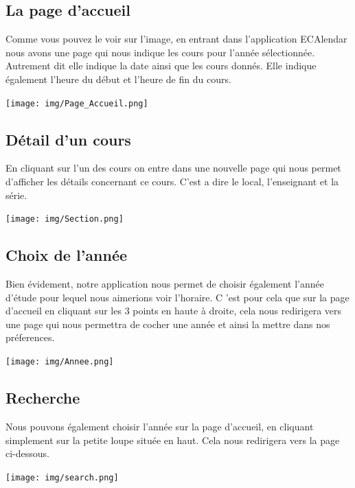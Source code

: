 \documentclass{article}
\begin{document}
	 \subsection{La page d'accueil}
	 Comme vous pouvez le voir sur l'image, en entrant dans l'application ECAlendar nous avons une page qui nous indique les cours pour l'ann\'ee s\'electionn\'ee. Autrement dit elle indique la date ainsi que les cours donn\'es. Elle indique \'egalement l'heure du début et l'heure de fin du cours.
	   \begin{center}
            \texttt{[image: img/Page\_Accueil.png]}
        \end{center}


	 \subsection{D\'etail d'un cours}
	 En cliquant sur l'un des cours on entre dans une nouvelle page qui nous permet d'afficher les d\'etails concernant ce cours. C'est a dire le local, l'enseignant et la s\'erie.
        \begin{center}
            \texttt{[image: img/Section.png]}
        \end{center}

            \subsection{Choix de l'ann\'ee}
	Bien évidement, notre application nous permet de choisir \'egalement l'ann\'ee d'\'etude pour lequel nous aimerions voir l'horaire. C 'est pour cela que sur la page d'accueil en  cliquant sur les 3 points  en haute \`a droite, cela nous redirigera vers une page qui nous permettra de cocher une ann\'ee et ainsi la mettre dans nos pr\'eferences.
        \begin{center}
            \texttt{[image: img/Annee.png]}
        \end{center}

	\subsection{Recherche}
	Nous pouvons \'egalement choisir l'ann\'ee sur la page d'accueil, en cliquant simplement sur la petite loupe situ\'ee en haut. Cela nous redirigera vers la page ci-dessous.
        \begin{center}
            \texttt{[image: img/search.png]}
        \end{center}
\end{document}
